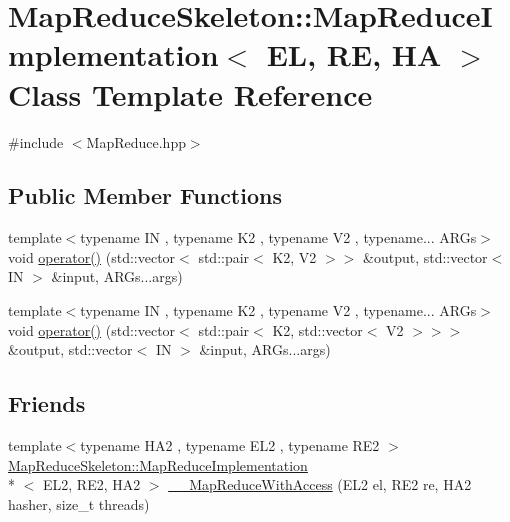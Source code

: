 \hypertarget{classMapReduceSkeleton_1_1MapReduceImplementation}{\section{Map\-Reduce\-Skeleton\-:\-:Map\-Reduce\-Implementation$<$ E\-L, R\-E, H\-A $>$ Class Template Reference}
\label{classMapReduceSkeleton_1_1MapReduceImplementation}
}


{\ttfamily \#include $<$Map\-Reduce.\-hpp$>$}

\subsection*{Public Member Functions}
\begin{DoxyCompactItemize}
\item 
{\footnotesize template$<$typename I\-N , typename K2 , typename V2 , typename... A\-R\-Gs$>$ }\\void \hyperlink{classMapReduceSkeleton_1_1MapReduceImplementation_a7efb23048e55a34c077bb4d138975e90}{operator()} (std\-::vector$<$ std\-::pair$<$ K2, V2 $>$$>$ \&output, std\-::vector$<$ I\-N $>$ \&input, A\-R\-Gs...\-args)
\item 
{\footnotesize template$<$typename I\-N , typename K2 , typename V2 , typename... A\-R\-Gs$>$ }\\void \hyperlink{classMapReduceSkeleton_1_1MapReduceImplementation_a748ee7eb69a715be2174efac5490eca3}{operator()} (std\-::vector$<$ std\-::pair$<$ K2, std\-::vector$<$ V2 $>$$>$$>$ \&output, std\-::vector$<$ I\-N $>$ \&input, A\-R\-Gs...\-args)
\end{DoxyCompactItemize}
\subsection*{Friends}
\begin{DoxyCompactItemize}
\item 
{\footnotesize template$<$typename H\-A2 , typename E\-L2 , typename R\-E2 $>$ }\\\hyperlink{classMapReduceSkeleton_1_1MapReduceImplementation}{Map\-Reduce\-Skeleton\-::\-Map\-Reduce\-Implementation}\\*
$<$ E\-L2, R\-E2, H\-A2 $>$ \hyperlink{classMapReduceSkeleton_1_1MapReduceImplementation_a80e197a2d638149e78927b4006a77496}{\-\_\-\-\_\-\-Map\-Reduce\-With\-Access} (E\-L2 el, R\-E2 re, H\-A2 hasher, size\-\_\-t threads)
\end{DoxyCompactItemize}


